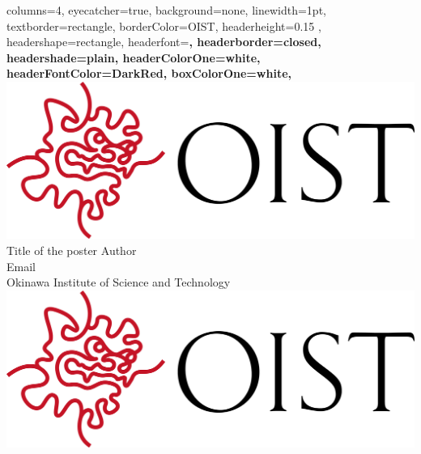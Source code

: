 \documentclass[
    a0paper, %
    landscape, %
    fontscale=0.3 %
    ]{baposter}
\begin{document}
\begin{poster}{ %
    columns=4, %
    eyecatcher=true, %
    background=none, %
    linewidth=1pt, %
    textborder=rectangle, %
    borderColor=OIST, %
    headerheight=0.15 \textheight, %
    headershape=rectangle, %
    headerfont=\large \sf \bf, %
    headerborder=closed, %
    headershade=plain, %
    headerColorOne=white, %
    headerFontColor=DarkRed, %
    boxColorOne=white, %
} 
{ \includegraphics[height=.75 \headerheight]{logo.jpg} } %
{ \color{OIST}\huge Title of the poster } %
{ \color{OIST}\small
  \vspace{1em} 
  Author\\
  Email\\
  Okinawa Institute of Science and Technology
} %
{ \includegraphics[height=.75 \headerheight]{logo.jpg} } %



\end{poster}
\end{document}

